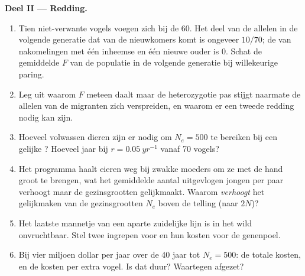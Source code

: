 \begin{problem}
\medskip
\noindent\textbf{Deel II --- Redding.}
\begin{enumerate}[resume]
  \item Tien niet-verwante vogels voegen zich bij de 60. Het deel van
        de allelen in de volgende generatie dat van de nieuwkomers komt
        is ongeveer $10/70$; de  van nakomelingen met
        één inheemse en één nieuwe ouder is $0$. Schat de gemiddelde
        $F$ van de populatie in de volgende generatie bij willekeurige
        paring.
  \item Leg uit waarom $F$ meteen daalt maar de heterozygotie pas
        stijgt naarmate de allelen van de migranten zich verspreiden,
        en waarom er een tweede redding nodig kan zijn.
  \item Hoeveel volwassen dieren zijn er nodig om $N_{e} = 500$ te
        bereiken bij een gelijke ? Hoeveel jaar bij
        $r = \qty{0.05}{yr^{-1}}$ vanaf 70 vogels?
  \item Het programma haalt eieren weg bij zwakke moeders om ze met de
        hand groot te brengen, wat het gemiddelde aantal uitgevlogen
        jongen per paar verhoogt maar de gezinsgrootten gelijkmaakt.
        Waarom \emph{verhoogt} het gelijkmaken van de gezinsgrootten
        $N_{e}$ boven de telling (naar $2N$)?
  \item Het laatste mannetje van een aparte zuidelijke lijn is in het
        wild onvruchtbaar. Stel twee ingrepen voor en hun kosten voor de
        genenpoel.
  \item Bij vier miljoen dollar per jaar over de 40 jaar tot
        $N_{e} = 500$: de totale kosten, en de kosten per extra vogel. Is dat duur?
        Waartegen afgezet?
\end{enumerate}


\end{problem}
